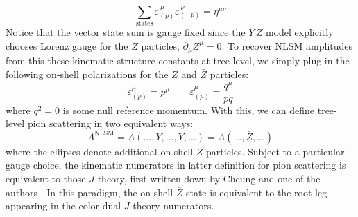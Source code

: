 \documentclass[11pt,letter]{article}
\def\be{\begin{equation}}
\def\ee{\end{equation}}
\begin{document}
\be
\sum_{\text{states}} \varepsilon^{\,\mu}_{(p)}\bar{\varepsilon}^{\,\nu}_{(-p)} = \eta^{\mu\nu}
\ee
Notice that the vector state sum is gauge fixed since the $Y\,Z$ model explicitly chooses Lorenz gauge for the $Z$ particles, $\partial_\mu Z^\mu=0$. To recover NLSM amplitudes from this these kinematic structure constants at tree-level, we simply plug in the following on-shell polarizations for the $Z$ and $\bar{Z}$ particles:
\be\label{eq:onShellZStates}
\varepsilon^\mu_{(p)} = p^\mu \qquad \bar{\varepsilon}^\mu_{(p)} = \frac{q^\mu}{pq}
\ee
where $q^2=0$ is some null reference momentum. With this, we can define tree-level pion scattering in two equivalent ways:
\be
A^{\text{NLSM}} = A(...,Y,...,Y,...) = A(...,\bar{Z},...) 
\ee
where the ellipses denote additional on-shell $Z$-particles. Subject to a particular gauge choice, the kinematic numerators in latter definition for pion scattering is equivalent to those $J$-theory, first written down by Cheung and one of the authors \cite{Cheung:2021zvb}. In this paradigm, the on-shell $\bar{Z}$ state is equivalent to the root leg appearing in the color-dual $J$-theory numerators. 
\end{document}
